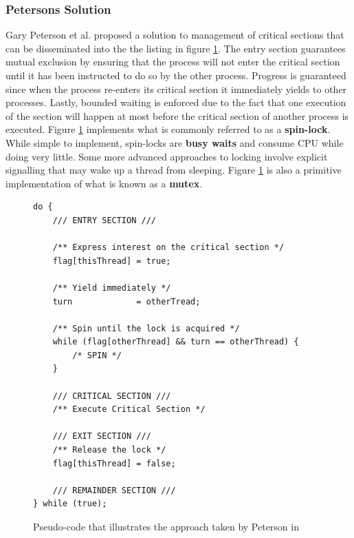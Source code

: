 \documentclass[10pt,a4paper]{article}
\begin{document}
\subsubsection{Petersons Solution}
Gary Peterson et al. \cite{Peterson} proposed a solution to management of critical sections that can be disseminated into the the listing in figure \ref{plisting}. The entry section guarantees mutual exclusion by ensuring that the process will not enter the critical section until it has been instructed to do so by the other process. Progress is guaranteed since when the process re-enters its critical section it immediately yields to other processes. Lastly, bounded waiting is enforced due to the fact that one execution of the section will happen at most before the critical section of another process is executed. Figure \ref{plisting} implements what is commonly referred to as a {\bf spin-lock}. While simple to implement, spin-locks are {\bf busy waits} and consume CPU while doing very little. Some more advanced approaches to locking involve explicit signalling that may wake up a thread from sleeping. Figure \ref{plisting} is also a primitive implementation of what is known as a {\bf mutex}.
\begin{figure}
\caption{Pseudo-code that illustrates the approach taken by Peterson in \cite{Peterson}}
\begin{center}
\begin{lstlisting}
do {
	/// ENTRY SECTION ///

	/** Express interest on the critical section */
	flag[thisThread] = true;
	
	/** Yield immediately */
	turn 			 = otherTread;
	
	/** Spin until the lock is acquired */
	while (flag[otherThread] && turn == otherThread) {
		/* SPIN */
	}
	
	/// CRITICAL SECTION ///
	/** Execute Critical Section */
	
	/// EXIT SECTION ///
	/** Release the lock */
	flag[thisThread] = false;
	
	/// REMAINDER SECTION ///
} while (true);
\end{lstlisting}
\label{plisting}
\end{center}
\end{figure}
\end{document}
